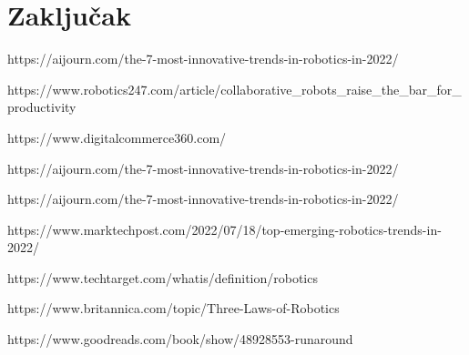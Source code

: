 \documentclass{report}
\begin{document}
	\chapter{Zaključak}
	

\begin{thebibliography}{99}
	
	https://aijourn.com/the-7-most-innovative-trends-in-robotics-in-2022/
	
	https://www.robotics247.com/article/collaborative\_robots\_raise\_the\_bar\_for\_productivity
	
	https://www.digitalcommerce360.com/
	
	https://aijourn.com/the-7-most-innovative-trends-in-robotics-in-2022/
	
	https://aijourn.com/the-7-most-innovative-trends-in-robotics-in-2022/
	
	https://www.marktechpost.com/2022/07/18/top-emerging-robotics-trends-in-2022/
	
	https://www.techtarget.com/whatis/definition/robotics
	
	https://www.britannica.com/topic/Three-Laws-of-Robotics
	
	https://www.goodreads.com/book/show/48928553-runaround
	
\end{thebibliography}
\end{document}
